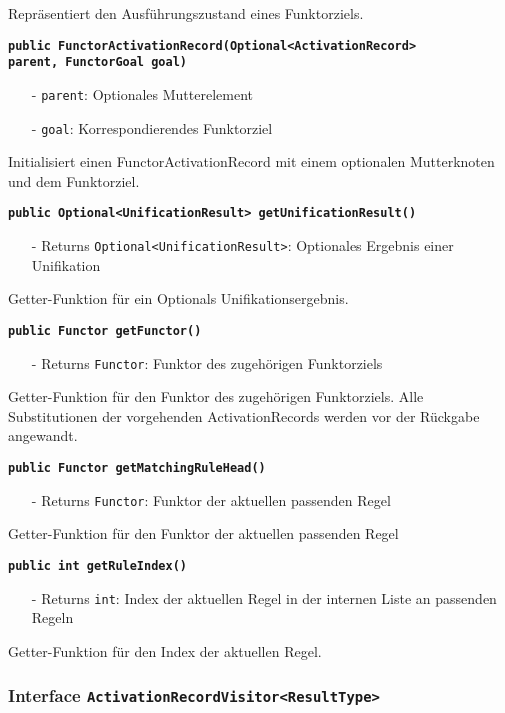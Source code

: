 \documentclass[parskip=full,11pt,twoside]{scrartcl}
\begin{document}
Repräsentiert den Ausführungszustand eines Funktorziels.

\textbf{\texttt{public FunctorActivationRecord(Optional<ActivationRecord>\\ parent, FunctorGoal goal)}}
\begin{itemize}[noitemsep]
	\item[-] \texttt{parent}: Optionales Mutterelement
	\item[-] \texttt{goal}: Korrespondierendes Funktorziel
\end{itemize}
Initialisiert einen FunctorActivationRecord mit einem optionalen Mutterknoten und dem Funktorziel.

\textbf{\texttt{public Optional<UnificationResult> getUnificationResult()}}
\begin{itemize}[noitemsep]
	\item[-] Returns \texttt{Optional<UnificationResult>}: Optionales Ergebnis einer Unifikation
\end{itemize}
Getter-Funktion für ein Optionals Unifikationsergebnis.

\textbf{\texttt{public Functor getFunctor()}}
\begin{itemize}[noitemsep]
	\item[-] Returns \texttt{Functor}: Funktor des zugehörigen Funktorziels
\end{itemize}
Getter-Funktion für den Funktor des zugehörigen Funktorziels. Alle Substitutionen der vorgehenden ActivationRecords werden vor der Rückgabe angewandt. 

\textbf{\texttt{public Functor getMatchingRuleHead()}}
\begin{itemize}[noitemsep]
	\item[-] Returns \texttt{Functor}: Funktor der aktuellen passenden Regel
\end{itemize}
Getter-Funktion für den Funktor der aktuellen passenden Regel

\textbf{\texttt{public int getRuleIndex()}}
\begin{itemize}[noitemsep]
	\item[-] Returns \texttt{int}: Index der aktuellen Regel in der internen Liste an passenden Regeln 
\end{itemize}
Getter-Funktion für den Index der aktuellen Regel.

\subsubsection{Interface \texttt{ActivationRecordVisitor<ResultType>}}
\end{document}
